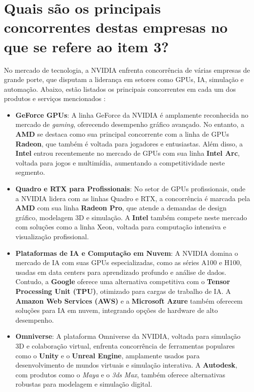 \section{Quais são os principais concorrentes destas empresas no que se refere ao item 3?}

No mercado de tecnologia, a NVIDIA enfrenta concorrência de várias empresas de grande porte, que disputam a liderança em setores como GPUs, IA, simulação e automação. Abaixo, estão listados os principais concorrentes em cada um dos produtos e serviços mencionados \cite{nvidia_competitors_ideiaveloz}:

\begin{itemize}
    \item \textbf{GeForce GPUs}: A linha GeForce da NVIDIA é amplamente reconhecida no mercado de \textit{gaming}, oferecendo desempenho gráfico avançado. No entanto, a \textbf{AMD} se destaca como sua principal concorrente com a linha de GPUs \textbf{Radeon}, que também é voltada para jogadores e entusiastas. Além disso, a \textbf{Intel} entrou recentemente no mercado de GPUs com sua linha \textbf{Intel Arc}, voltada para jogos e multimídia, aumentando a competitividade neste segmento.

    \item \textbf{Quadro e RTX para Profissionais}: No setor de GPUs profissionais, onde a NVIDIA lidera com as linhas Quadro e RTX, a concorrência é marcada pela \textbf{AMD} com sua linha \textbf{Radeon Pro}, que atende a demandas de design gráfico, modelagem 3D e simulação. A \textbf{Intel} também compete neste mercado com soluções como a linha Xeon, voltada para computação intensiva e visualização profissional.

    \item \textbf{Plataformas de IA e Computação em Nuvem}: A NVIDIA domina o mercado de IA com suas GPUs especializadas, como as séries A100 e H100, usadas em data centers para aprendizado profundo e análise de dados. Contudo, a \textbf{Google} oferece uma alternativa competitiva com o \textbf{Tensor Processing Unit (TPU)}, otimizado para cargas de trabalho de IA. A \textbf{Amazon Web Services (AWS)} e a \textbf{Microsoft Azure} também oferecem soluções para IA em nuvem, integrando opções de hardware de alto desempenho.

    \item \textbf{Omniverse}: A plataforma Omniverse da NVIDIA, voltada para simulação 3D e colaboração virtual, enfrenta concorrência de ferramentas populares como o \textbf{Unity} e o \textbf{Unreal Engine}, amplamente usados para desenvolvimento de mundos virtuais e simulação interativa. A \textbf{Autodesk}, com produtos como o \textit{Maya} e o \textit{3ds Max}, também oferece alternativas robustas para modelagem e simulação digital.


\end{itemize}
